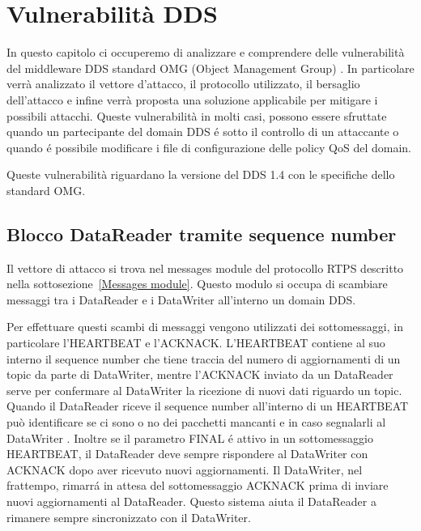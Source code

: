 \chapter{Vulnerabilità DDS}


In questo capitolo ci occuperemo di analizzare e comprendere delle vulnerabilità
del middleware DDS standard OMG (Object Management Group) \cite{8469351}. 
In particolare
verrà analizzato il vettore d'attacco, il protocollo utilizzato, il bersaglio
dell'attacco e infine verrà proposta una soluzione applicabile per
mitigare i possibili attacchi. %
Queste vulnerabilità in molti casi, possono essere sfruttate 
quando un partecipante del domain DDS é sotto il controllo di un attaccante
o quando é possibile modificare i file di configurazione delle policy QoS 
del domain.

Queste vulnerabilità riguardano la versione del DDS 1.4 con le specifiche 
dello standard OMG.




\section{Blocco DataReader tramite sequence number}

Il vettore di attacco si trova nel messages module del protocollo RTPS
descritto nella sottosezione~\ref{Messages module}. Questo modulo
si occupa di scambiare messaggi tra i DataReader e i DataWriter 
all'interno un domain DDS.

Per effettuare questi scambi di messaggi vengono utilizzati dei sottomessaggi,
in particolare l'HEARTBEAT e l'ACKNACK.
L'HEARTBEAT contiene al suo interno il sequence number che tiene traccia 
del numero di aggiornamenti di un topic da parte di DataWriter, mentre
l'ACKNACK inviato da un DataReader
serve per confermare al DataWriter la ricezione di nuovi dati 
riguardo un topic.
Quando il DataReader riceve il sequence number all'interno di un HEARTBEAT
può identificare se ci sono o no dei pacchetti mancanti e in caso segnalarli al
DataWriter \cite{White2017AnII}.
Inoltre se il parametro FINAL é attivo in un sottomessaggio HEARTBEAT, il DataReader 
deve sempre rispondere al DataWriter con ACKNACK dopo aver ricevuto nuovi aggiornamenti.
Il DataWriter, nel frattempo, rimarrá in attesa del sottomessaggio 
ACKNACK prima di 
inviare nuovi aggiornamenti al DataReader.
Questo sistema aiuta il DataReader a rimanere sempre sincronizzato con il 
DataWriter.

